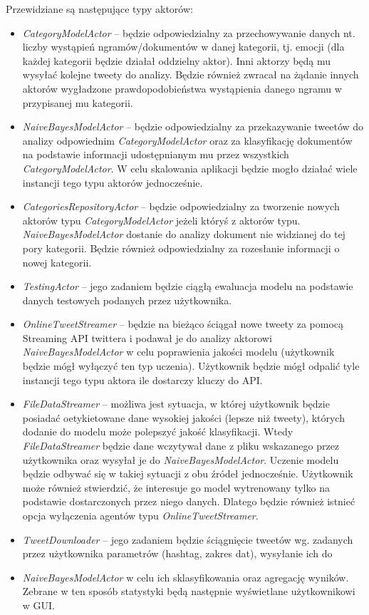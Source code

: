 \documentclass[12pt]{article}
\begin{document}
Przewidziane są następujące typy aktorów:
\begin{itemize}
\item \emph{CategoryModelActor} -- będzie odpowiedzialny za przechowywanie danych nt. liczby wystąpień ngramów/dokumentów w danej kategorii, tj. emocji (dla każdej kategorii będzie działał oddzielny aktor). Inni aktorzy będą mu wysyłać kolejne tweety do analizy. Będzie również zwracał na żądanie innych aktorów wygładzone prawdopodobieństwa wystąpienia danego ngramu w przypisanej mu kategorii.
\item \emph{NaiveBayesModelActor} -- będzie odpowiedzialny za przekazywanie tweetów do analizy odpowiednim \emph{CategoryModelActor} oraz za klasyfikację dokumentów na podstawie informacji udostępnianym mu przez wszystkich \emph{CategoryModelActor}. W celu skalowania aplikacji będzie mogło działać wiele instancji tego typu aktorów jednocześnie.
\item \emph{CategoriesRepositoryActor} -- będzie odpowiedzialny za tworzenie nowych aktorów typu \emph{CategoryModelActor} jeżeli któryś z aktorów typu. \emph{NaiveBayesModelActor} dostanie do analizy dokument nie widzianej do tej pory kategorii. Będzie również odpowiedzialny za rozesłanie informacji o nowej kategorii.
\item \emph{TestingActor} -- jego zadaniem będzie ciągłą ewaluacja modelu na podstawie danych testowych podanych przez użytkownika.
\item \emph{OnlineTweetStreamer} -- będzie na bieżąco ściągał nowe tweety za pomocą Streaming API twittera i podawał je do analizy aktorowi \emph{NaiveBayesModelActor} w celu poprawienia jakości modelu (użytkownik będzie mógł wyłączyć ten typ uczenia). Użytkownik będzie mógł odpalić tyle instancji tego typu aktora ile dostarczy kluczy do API.
\item \emph{FileDataStreamer} -- możliwa jest sytuacja, w której użytkownik będzie posiadać oetykietowane dane wysokiej jakości (lepsze niż tweety), których dodanie do modelu może polepszyć jakość klasyfikacji. Wtedy \emph{FileDataStreamer} będzie dane wczytywał dane z pliku wskazanego przez użytkownika oraz wysyłał je do \emph{NaiveBayesModelActor}. Uczenie modelu będzie odbywać się w takiej sytuacji z obu źródeł jednocześnie. Użytkownik może również stwierdzić, że interesuje go model wytrenowany tylko na podstawie dostarczonych przez niego danych. Dlatego będzie również istnieć opcja wyłączenia agentów typu \emph{OnlineTweetStreamer}.
\item \emph{TweetDownloader} -- jego zadaniem będzie ściągnięcie tweetów wg. zadanych przez użytkownika parametrów (hashtag, zakres dat), wysyłanie ich do \item \emph{NaiveBayesModelActor} w celu ich sklasyfikowania oraz agregację wyników. Zebrane w ten sposób statystyki będą następnie wyświetlane użytkownikowi w GUI.
\end{itemize}
\end{document}
